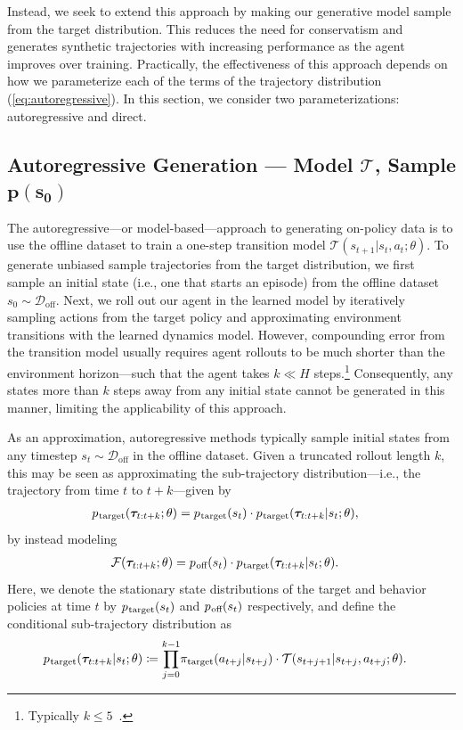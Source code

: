 \documentclass[10pt]{article} %
\theoremstyle{plain}
\theoremstyle{definition}
\theoremstyle{remark}
\newcommand{\ptarg}{p_{\mkern1mu\text{target}}}
\newcommand{\poff}{p_{\mkern1mu\text{off}}}
\newcommand{\doff}{\mathcal{D}_{\text{off}}}
\begin{document}
Instead, we seek to extend this approach by making our generative model sample from the target distribution.
This reduces the need for conservatism and generates synthetic trajectories with increasing performance as the agent improves over training.
Practically, the effectiveness of this approach depends on how we parameterize each of the terms of the trajectory distribution (\autoref{eq:autoregressive}).
In this section, we consider two parameterizations: autoregressive and direct.




\subsection{Autoregressive Generation --- Model $\bm{\mathcal{T}}$, Sample $\bm{p(s_0)}$}
\label{sec:autoregressive}
The autoregressive---or model-based---approach to generating on-policy data is to use the offline dataset to train a one-step transition model $\mathcal{T}(s_{t+1}|s_t, a_t;\theta)$.
To generate unbiased sample trajectories from the target distribution, we first sample an initial state (i.e., one that starts an episode) from the offline dataset $s_0\sim\doff$.
Next, we roll out our agent in the learned model by iteratively sampling actions from the target policy and approximating environment transitions with the learned dynamics model.
However, compounding error from the transition model usually requires agent rollouts to be much shorter than the environment horizon---such that the agent takes $k\ll H$ steps.\footnote{Typically $k\leq 5$~\citep{janner2019mbpo, mopo}.}
Consequently, any states more than $k$ steps away from any initial state cannot be generated in this manner, limiting the applicability of this approach.

As an approximation, autoregressive methods typically sample initial states from any timestep $s_t\sim\doff$ in the offline dataset.
Given a truncated rollout length $k$, this may be seen as approximating the sub-trajectory distribution---i.e., the trajectory from time $t$ to $t+k$---given by
\begin{align}
    \ptarg(\bm{\tau}_{t:t+k};\theta) &= \ptarg(s_t)\cdot \ptarg(\bm{\tau}_{t:t+k} | s_t;\theta),
\end{align}
by instead modeling
\begin{align}
    \mathcal{F}(\bm{\tau}_{t:t+k};\theta) &= \poff(s_t)\cdot \ptarg(\bm{\tau}_{t:t+k} | s_t;\theta) \label{eq:trunc-wm} \text{.}
\end{align}
Here, we denote the stationary state distributions of the target and behavior policies at time $t$ by $\ptarg(s_t)$ and $\poff(s_t)$ respectively, and define the conditional sub-trajectory distribution as
\begin{align}
    \label{eq:marginal-ar}
    \ptarg(\bm{\tau}_{t:t+k} | s_t;\theta) \coloneqq \prod_{j=0}^{k-1} &\pi_{\text{target}}(a_{t+j}|s_{t+j}) \cdot \mathcal{T}(s_{t+j+1}|s_{t+j}, a_{t+j};\theta)\text{.}
\end{align}
\end{document}
